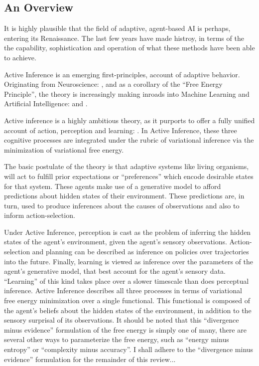 \documentclass[onecolumn]{IEEEtran}
\begin{document}
\subsection{An Overview}

It is highly plausible that the field of adaptive, agent-based AI is perhaps, entering its Renaissance. The last few years have made histroy, in terms of the the capability, sophistication and operation of what these methods have been able to achieve.

Active Inference is an emerging first-principles, account of adaptive behavior. Originating from Neuroscience: \textcite{A_FEP_For_The_Brain}, \textcite{The-Bayesian-Brain} and \textcite{Action-Behaviour-FE} as a corollary of the ``Free Energy Principle'', the theory is increasingly making inroads into Machine Learning and Artificial Intelligence: \textcite{RL-or-AIF} and \textcite{Applications-of-FEP-Machine-Learning-Neuroscience}. 

Active inference is a highly ambitious theory, as it purports to offer a fully unified account of action, perception and learning: \textcite{FEP-Unified-Brain-Theory}. In Active Inference, these three cognitive processes are integrated under the rubric of variational inference via the minimization of variational free energy. 

The basic postulate of the theory is that adaptive systems like living organisms, will act to fulfill prior expectations or ``preferences'' which encode desirable states for that system. These agents make use of a generative model to afford predictions about hidden states of their environment. These predictions are, in turn, used to produce inferences about the causes of observations and also to inform action-selection. 

Under Active Inference, perception is cast as the problem of inferring the hidden states of the agent's environment, given the agent's sensory observations. Action-selection and planning can be described as inference on policies over trajectories into the future. Finally, learning is viewed as inference over the parameters of the agent's generative model, that best account for the agent's sensory data. ``Learning'' of this kind takes place over a slower timescale than does perceptual inference. Active Inference describes all three processes in terms of variational free energy minimization over a single functional. This functional is composed of the agent's beliefs about the hidden states of the environment, in addition to the sensory surprisal of its observations. It should be noted that this ``divergence minus evidence'' formulation of the free energy is simply one of many, there are several other ways to parameterize the free energy, such as ``energy minus entropy'' or ``complexity minus accuracy''. I shall adhere to the ``divergence minus evidence'' formulation for the remainder of this review...
\end{document}
